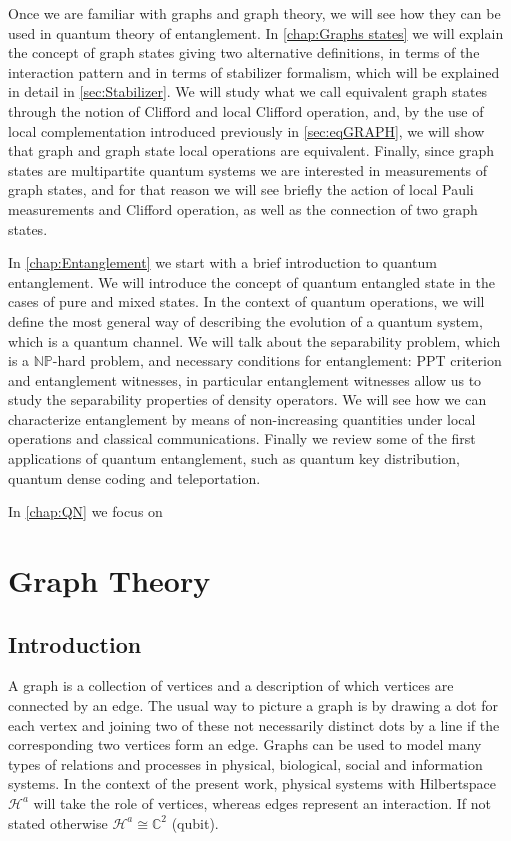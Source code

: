 \documentclass[10pt,a4paper]{book}
\numberwithin{equation}{chapter}
\numberwithin{figure}{chapter}
\numberwithin{table}{chapter}
\begin{document}
Once we are familiar with graphs and graph theory, we will see how they can be used in quantum theory of entanglement. In \autoref{chap:Graphs states} we will explain the concept of graph states giving two alternative definitions, in terms of the interaction pattern and in terms of stabilizer formalism, which  will be explained in detail in \autoref{sec:Stabilizer}. We will study what we call equivalent graph states through the notion of Clifford and local Clifford operation, and, by the use of local complementation introduced previously in \autoref{sec:eqGRAPH}, we will show that graph and graph state local operations are equivalent. Finally, since graph states are multipartite quantum systems we are interested in measurements of graph states, and for that reason we will see briefly the action of local Pauli measurements and Clifford operation, as well as the connection of two graph states.

In \autoref{chap:Entanglement} we start with a brief introduction to quantum entanglement. We will introduce the concept of quantum entangled state in the cases of pure and mixed states. In the context of quantum operations, we will define the most general way of describing the evolution of a quantum system, which is a quantum channel. We will talk about the separability problem, which is a $\mathbb{NP}$-hard problem, and necessary conditions for entanglement: PPT criterion and entanglement witnesses, in particular entanglement witnesses allow us to study the separability properties of density operators. We will see how we can characterize entanglement by means of non-increasing quantities under local operations and classical communications. Finally we review some of the first applications of quantum entanglement, such as quantum key distribution, quantum dense coding and teleportation. 

In \autoref{chap:QN} we focus on 


\chapter{Graph Theory}\label{chap:Graphs}
\section{Introduction}
A graph is a collection of vertices and a description of which vertices are connected by an edge. The usual way to picture a graph is by drawing a dot for each vertex and joining two of these not necessarily distinct dots by a line if the corresponding two vertices form an edge. Graphs can be used to model many types of relations and processes in physical, biological, social and information systems. In the context of the present work, physical systems with Hilbertspace $\mathcal{H}^a$ will take the role of vertices, whereas edges represent an interaction. If not stated otherwise $\mathcal{H}^a \cong \mathbb{C}^2$ (qubit).
\end{document}
